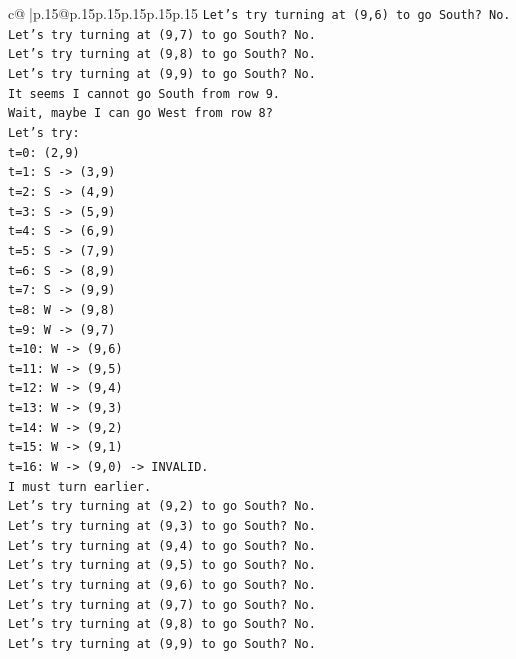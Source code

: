\documentclass{article}
\begin{document}
{\begin{supertabular}{c@{$\;$}|p{.15\linewidth}@{}p{.15\linewidth}p{.15\linewidth}p{.15\linewidth}p{.15\linewidth}p{.15\linewidth}}
{{{\texttt{Let's try turning at (9,6) to go South? No.} \\
\texttt{Let's try turning at (9,7) to go South? No.} \\
\texttt{Let's try turning at (9,8) to go South? No.} \\
\texttt{Let's try turning at (9,9) to go South? No.} \\
\texttt{It seems I cannot go South from row 9.} \\
\texttt{Wait, maybe I can go West from row 8?} \\
\texttt{Let's try:} \\
\texttt{t=0: (2,9)} \\
\texttt{t=1: S {-}> (3,9)} \\
\texttt{t=2: S {-}> (4,9)} \\
\texttt{t=3: S {-}> (5,9)} \\
\texttt{t=4: S {-}> (6,9)} \\
\texttt{t=5: S {-}> (7,9)} \\
\texttt{t=6: S {-}> (8,9)} \\
\texttt{t=7: S {-}> (9,9)} \\
\texttt{t=8: W {-}> (9,8)} \\
\texttt{t=9: W {-}> (9,7)} \\
\texttt{t=10: W {-}> (9,6)} \\
\texttt{t=11: W {-}> (9,5)} \\
\texttt{t=12: W {-}> (9,4)} \\
\texttt{t=13: W {-}> (9,3)} \\
\texttt{t=14: W {-}> (9,2)} \\
\texttt{t=15: W {-}> (9,1)} \\
\texttt{t=16: W {-}> (9,0) {-}> INVALID.} \\
\texttt{I must turn earlier.} \\
\texttt{Let's try turning at (9,2) to go South? No.} \\
\texttt{Let's try turning at (9,3) to go South? No.} \\
\texttt{Let's try turning at (9,4) to go South? No.} \\
\texttt{Let's try turning at (9,5) to go South? No.} \\
\texttt{Let's try turning at (9,6) to go South? No.} \\
\texttt{Let's try turning at (9,7) to go South? No.} \\
\texttt{Let's try turning at (9,8) to go South? No.} \\
\texttt{Let's try turning at (9,9) to go South? No.} \\
}}}
\end{supertabular}}
\end{document}
